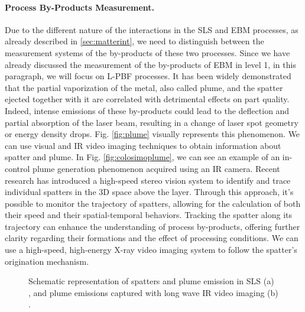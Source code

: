 \paragraph{Process By-Products Measurement.} Due to the different nature of the interactions in the SLS and EBM processes, as already described in \ref{sec:matterint}, we need to distinguish between the measurement systems of the by-products of these two processes. Since we have already discussed the measurement of the by-products of EBM in level 1, in this paragraph, we will focus on L-PBF processes. It has been widely demonstrated that the partial vaporization of the metal, also called plume, and the spatter ejected together with it are correlated with detrimental effects on part quality. Indeed, intense emissions of these by-products could lead to the deflection and partial absorption of the laser beam, resulting in a change of laser spot geometry or energy density drops. Fig. \ref{fig:plume} visually represents this phenomenon. We can use visual and IR video imaging techniques to obtain information about spatter and plume. In Fig. \ref{fig:colosimoplume}, we can see an example of an in-control plume generation phenomenon acquired using an IR camera. Recent research has introduced a high-speed stereo vision system to identify and trace individual spatters in the 3D space above the layer. Through this approach, it's possible to monitor the trajectory of spatters, allowing for the calculation of both their speed and their spatial-temporal behaviors. Tracking the spatter along its trajectory can enhance the understanding of process by-products, offering further clarity regarding their formations and the effect of processing conditions. We can use a high-speed, high-energy X-ray video imaging system to follow the spatter's origination mechanism.
\begin{figure}
    \centering
    \qquad
    \caption[Spatters and plume in SLS]{Schematic representation of spatters and plume emission in SLS (a) \cite{grasso_-situ_2021}, and plume emissions captured with long wave IR video imaging (b) \cite{grasso_statistical_2019}.}
\end{figure}
